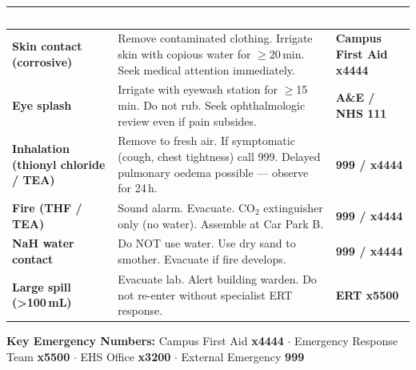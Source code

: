 \vspace{10pt}


\vspace{4pt}

\noindent
\begin{tabularx}{\linewidth}{@{}
  >{\small\bfseries}p{2.8cm}
  >{\small}X
  >{\small\bfseries}p{2.4cm}
  @{}}
\toprule
\rowcolor{SlateBlue!80}
\textcolor{white}{\textbf{Incident Type}} &
\textcolor{white}{\textbf{Immediate Action}} &
\textcolor{white}{\textbf{Contact}} \\
\midrule
\rowcolor{LightFog}
Skin contact (corrosive) &
Remove contaminated clothing. Irrigate skin with copious water for $\geq$20\,min.
Seek medical attention immediately. &
Campus First Aid x4444 \\
\rowcolor{white}
Eye splash &
Irrigate with eyewash station for $\geq$15\,min. Do not rub. Seek ophthalmologic
review even if pain subsides. &
A\&E / NHS 111 \\
\rowcolor{LightFog}
Inhalation (thionyl chloride / TEA) &
Remove to fresh air. If symptomatic (cough, chest tightness) call 999.
Delayed pulmonary oedema possible --- observe for 24\,h. &
999 / x4444 \\
\rowcolor{white}
Fire (THF / TEA) &
Sound alarm. Evacuate. CO$_2$ extinguisher only (no water). Assemble at
Car Park B. &
999 / x4444 \\
\rowcolor{LightFog}
NaH water contact &
Do NOT use water. Use dry sand to smother. Evacuate if fire develops. &
999 / x4444 \\
\rowcolor{white}
Large spill (\textgreater{}100\,mL) &
Evacuate lab. Alert building warden. Do not re-enter without specialist ERT
response. &
ERT x5500 \\
\bottomrule
\end{tabularx}

\vspace{4pt}
\begin{tcolorbox}[warnbox]
  \faPhone\quad \textbf{Key Emergency Numbers:}
  Campus First Aid \textbf{x4444} $\cdot$
  Emergency Response Team \textbf{x5500} $\cdot$
  EHS Office \textbf{x3200} $\cdot$
  External Emergency \textbf{999}
\end{tcolorbox}
